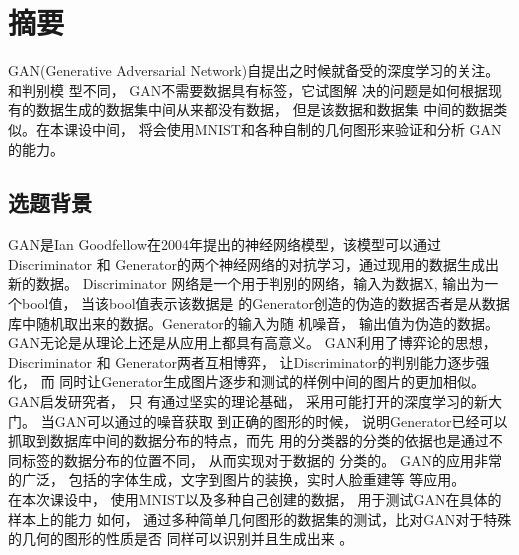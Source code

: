 \chapter{摘要}
GAN(Generative Adversarial Network)自提出之时候就备受的深度学习的关注。和判别模
型不同， GAN不需要数据具有标签，它试图解
决的问题是如何根据现有的数据生成的数据集中间从来都没有数据， 但是该数据和数据集
中间的数据类似。在本课设中间， 将会使用MNIST和各种自制的几何图形来验证和分析
GAN的能力。

\section{选题背景}
GAN是Ian Goodfellow在2004年提出的神经网络模型，该模型可以通过Discriminator 和
Generator的两个神经网络的对抗学习，通过现用的数据生成出新的数据。 Discriminator
网络是一个用于判别的网络，输入为数据X, 输出为一个bool值， 当该bool值表示该数据是
的Generator创造的伪造的数据否者是从数据库中随机取出来的数据。Generator的输入为随
机噪音， 输出值为伪造的数据。\\
    GAN无论是从理论上还是从应用上都具有高意义。 GAN利用了博弈论的思想，
Discriminator 和 Generator两者互相博弈， 让Discriminator的判别能力逐步强化， 而
同时让Generator生成图片逐步和测试的样例中间的图片的更加相似。GAN启发研究者， 只
有通过坚实的理论基础， 采用可能打开的深度学习的新大门。 当GAN可以通过的噪音获取
到正确的图形的时候， 说明Generator已经可以抓取到数据库中间的数据分布的特点，而先
用的分类器的分类的依据也是通过不同标签的数据分布的位置不同， 从而实现对于数据的
分类的。 GAN的应用非常的广泛， 包括的字体生成，文字到图片的装换，实时人脸重建等
等应用。\\
    在本次课设中， 使用MNIST以及多种自己创建的数据， 用于测试GAN在具体的样本上的能力
如何， 通过多种简单几何图形的数据集的测试，比对GAN对于特殊的几何的图形的性质是否
同样可以识别并且生成出来
。


